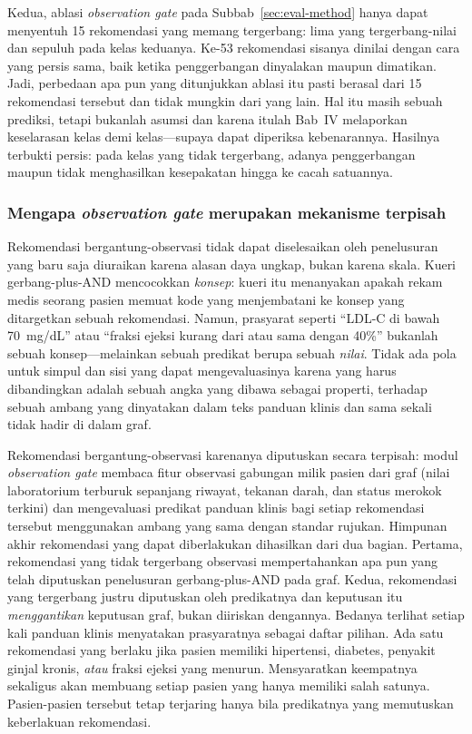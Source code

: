 Kedua, ablasi \emph{observation gate} pada Subbab~\ref{sec:eval-method}
hanya dapat menyentuh 15 rekomendasi yang memang tergerbang: lima yang tergerbang-nilai
dan sepuluh pada kelas keduanya. Ke-53 rekomendasi sisanya dinilai dengan cara yang persis
sama, baik ketika penggerbangan dinyalakan maupun dimatikan. Jadi, perbedaan apa pun
yang ditunjukkan ablasi itu pasti berasal dari 15 rekomendasi tersebut dan tidak mungkin dari yang
lain. Hal itu masih sebuah prediksi, tetapi bukanlah asumsi dan karena itulah Bab~IV melaporkan keselarasan
kelas demi kelas---supaya dapat diperiksa kebenarannya. Hasilnya terbukti persis: pada kelas yang tidak tergerbang, adanya penggerbangan maupun tidak menghasilkan kesepakatan hingga ke cacah satuannya.

\subsubsection*{Mengapa \emph{observation gate} merupakan mekanisme terpisah}
Rekomendasi bergantung-observasi tidak dapat diselesaikan oleh penelusuran yang baru saja
diuraikan karena alasan daya ungkap, bukan karena skala. Kueri gerbang-plus-AND mencocokkan
\emph{konsep}: kueri itu menanyakan apakah rekam medis seorang pasien memuat kode yang
menjembatani ke konsep yang ditargetkan sebuah rekomendasi. Namun, prasyarat seperti ``LDL-C di
bawah 70~mg/dL'' atau ``fraksi ejeksi kurang dari atau sama dengan 40\%'' bukanlah sebuah
konsep---melainkan sebuah predikat berupa sebuah \emph{nilai}. Tidak ada pola untuk simpul dan
sisi yang dapat mengevaluasinya karena yang harus dibandingkan adalah sebuah angka yang
dibawa sebagai properti, terhadap sebuah ambang yang dinyatakan dalam teks panduan klinis dan sama
sekali tidak hadir di dalam graf.

Rekomendasi bergantung-observasi karenanya diputuskan secara terpisah: modul
\emph{observation gate} membaca fitur observasi gabungan milik pasien dari graf (nilai laboratorium
terburuk sepanjang riwayat, tekanan darah, dan status merokok terkini) dan mengevaluasi
predikat panduan klinis bagi setiap rekomendasi tersebut menggunakan ambang yang sama dengan standar
rujukan. Himpunan akhir rekomendasi yang dapat diberlakukan dihasilkan dari dua bagian. Pertama, rekomendasi
yang tidak tergerbang observasi mempertahankan apa pun yang telah diputuskan
penelusuran gerbang-plus-AND pada graf. Kedua, rekomendasi yang tergerbang justru diputuskan
oleh predikatnya dan keputusan itu \emph{menggantikan} keputusan graf, bukan diiriskan dengannya.
Bedanya terlihat setiap kali panduan klinis menyatakan prasyaratnya sebagai daftar pilihan. Ada satu rekomendasi yang berlaku jika pasien memiliki hipertensi, diabetes, penyakit ginjal
kronis, \emph{atau} fraksi ejeksi yang menurun. Mensyaratkan keempatnya sekaligus akan
membuang setiap pasien yang hanya memiliki salah satunya. Pasien-pasien tersebut tetap
terjaring hanya bila predikatnya yang memutuskan keberlakuan rekomendasi.

